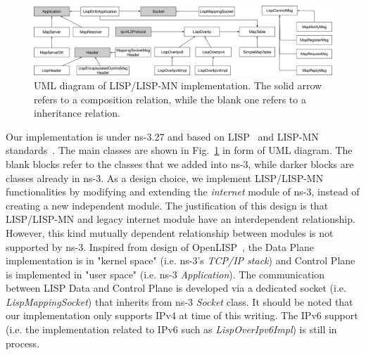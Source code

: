 \begin{figure}[!t]
	\centering
	\includegraphics[width=\textwidth]{Pics/LISP-NS3-UML}
	\caption{UML diagram of LISP/LISP-MN implementation. The solid arrow refers to a composition relation, while the blank one refers to a inheritance relation.}
	\label{LISP-UML}
\end{figure}
Our implementation is under ns-3.27 and based on LISP~\cite{rfc6830} and LISP-MN standards~\cite{meyer2016lisp}. The main classes are shown in Fig.~\ref{LISP-UML} in form of UML diagram. The blank blocks refer to the classes that we added into ns-3, while darker blocks are classes already in ns-3. As a design choice, we implement LISP/LISP-MN functionalities by modifying and extending the \emph{internet} module of ns-3, instead of creating a new independent module. The justification of this design is that LISP/LISP-MN and legacy internet module have an interdependent relationship. However, this kind mutually dependent relationship between modules is not supported by ns-3. Inspired from design of OpenLISP~\cite{saucez2009openlisp}, the Data Plane implementation is in "kernel space" (i.e. ns-3's \emph{TCP/IP stack}) and Control Plane is implemented in "user space" (i.e. ns-3 \emph{Application}). The communication between LISP Data and Control Plane is developed via a dedicated socket (i.e. \emph{LispMappingSocket}) that inherits from ns-3 \emph{Socket} class. It should be noted that our implementation only supports IPv4 at time of this writing. The IPv6 support (i.e. the implementation related to IPv6 such as \emph{LispOverIpv6Impl}) is still in process.  

